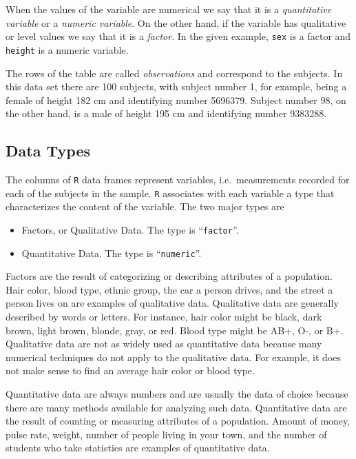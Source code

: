 \documentclass[]{krantz}
\theoremstyle{definition}
\theoremstyle{definition}
\theoremstyle{definition}
\theoremstyle{remark}
\begin{document}
When the values of the variable are numerical we say that it is a
\emph{quantitative variable} or a \emph{numeric variable}. On the other
hand, if the variable has qualitative or level values we say that it is
a \emph{factor}. In the given example, \texttt{sex} is a factor and
\texttt{height} is a numeric variable.

The rows of the table are called \emph{observations} and correspond to
the subjects. In this data set there are 100 subjects, with subject
number 1, for example, being a female of height 182 cm and identifying
number 5696379. Subject number 98, on the other hand, is a male of
height 195 cm and identifying number 9383288.

\subsection{Data Types}\label{data-types}

The columns of \texttt{R} data frames represent variables,
i.e.~measurements recorded for each of the subjects in the sample.
\texttt{R} associates with each variable a type that characterizes the
content of the variable. The two major types are

\begin{itemize}
\item
  Factors, or Qualitative Data. The type is ``\texttt{factor}''.
\item
  Quantitative Data. The type is ``\texttt{numeric}''.
\end{itemize}

Factors are the result of categorizing or describing attributes of a
population. Hair color, blood type, ethnic group, the car a person
drives, and the street a person lives on are examples of qualitative
data. Qualitative data are generally described by words or letters. For
instance, hair color might be black, dark brown, light brown, blonde,
gray, or red. Blood type might be AB+, O-, or B+. Qualitative data are
not as widely used as quantitative data because many numerical
techniques do not apply to the qualitative data. For example, it does
not make sense to find an average hair color or blood type.

Quantitative data are always numbers and are usually the data of choice
because there are many methods available for analyzing such data.
Quantitative data are the result of counting or measuring attributes of
a population. Amount of money, pulse rate, weight, number of people
living in your town, and the number of students who take statistics are
examples of quantitative data.
\end{document}
